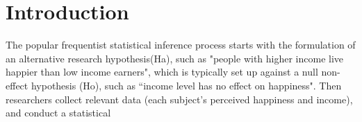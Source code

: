 \documentclass[inte,blindrev]{informs3}
\begin{document}
%


\section{Introduction}

The popular frequentist statistical inference process starts with the formulation of an alternative research hypothesis(Ha), such as "people with higher income live happier than low income earners", which is typically set up against a null non-effect hypothesis (Ho), such as ``income level has no effect on happiness". Then researchers collect relevant data (each subject's perceived happiness and income), and conduct a statistical  
\citep{Tipping2004bayesian}
\end{document}
